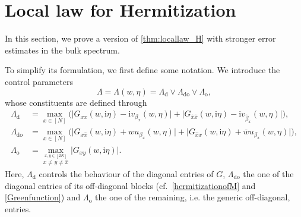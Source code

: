 \documentclass[11pt]{article}
\newcommand{\ii}{\mathrm{i}}
\newcommand{\absb}[1]{\bigl| #1 \bigr|}
\theoremstyle{plain}
\theoremstyle{remark}
\numberwithin{equation}{section}
\newcommand*\ubarr[1]{{\widehat{#1}}}
\begin{document}
	
	

	

		\section{Local law for Hermitization}  \label{section:proof_local_law_H} 
		
	In this section, we prove a version of \cref{thm:locallaw_H} with stronger error estimates in the bulk spectrum. 
	
	To simplify its formulation, we first define some notation. We introduce the control parameters
	\begin{equation}\label{eq:def_Lambda}
		\Lambda = \Lambda(w,\eta) = \Lambda_{\mathrm{d}} \vee \Lambda_{\mathrm{do}} \vee \Lambda_{\mathrm{o}}, 
	\end{equation}
whose constituents are defined through 
	\begin{align*}
		\Lambda_{\mathrm{d}} &= \max_{x \in [N]} \Big( \absb{G_{xx}(w,\ii \eta) - \ii v_{\beta_x}(w,\eta)} +
		\absb{G_{\ubarr{x}\ubarr{x}}(w,\ii \eta) - \ii v_{\ubarr{\beta}_x}(w,\eta)}
		\Big),\\
		\Lambda_{\mathrm{do}} &= \max_{x \in [N]} \Big( 
		\absb{G_{x\ubarr{x}}(w,\ii\eta) + w u_{\beta_x}(w,\eta)} 
		+ \absb{G_{\ubarr{x}x}(w,\ii\eta) + \overline{w} u_{{\beta}_x}(w,\eta)} \Big), \\
		\Lambda_{\mathrm{o}} &=\max_{\stackrel{x,y \in [2N]}{x \neq y \neq \ubarr{x}}}\absb{G_{xy}(w, \ii \eta)}.
	\end{align*}
	Here, $\Lambda_{\mathrm{d}}$ controls the behaviour of the diagonal entries of $G$, $\Lambda_{\mathrm{do}}$ the one of the diagonal entries of its off-diagonal blocks (cf.\  \eqref{hermitizationofM} and \eqref{Greenfunction}) and $\Lambda_{\mathrm{o}}$ the one of the remaining, i.e.
	the generic off-diagonal, entries.
	
\end{document}
